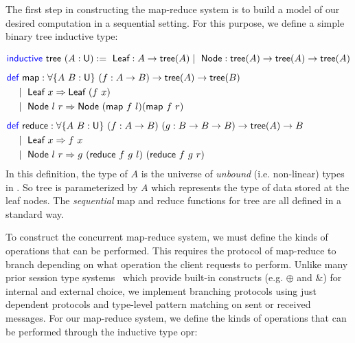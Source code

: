 The first step in constructing the map-reduce system is to build a model of our desired
computation in a sequential setting. For this purpose, we define a simple binary tree
inductive type:

\vspace{-1em}
\begingroup
\small
\addtolength{\jot}{-0.25em}
\begin{alignat*}{4}
  &\Inductive\ \textsf{tree}\ (A : \Un) :=\
    \textsf{Leaf} : A \rightarrow \textsf{tree}(A) \mid\
    \textsf{Node} : \textsf{tree}(A) \rightarrow \textsf{tree}(A) \rightarrow \textsf{tree}(A)
  \\[0.4em]
  &\begin{alignedat}{4}
    &\Def\ \textsf{map} : \forall \{A\ B : \Un\}\ (f : A \rightarrow B) \rightarrow \textsf{tree}(A) \rightarrow \textsf{tree}(B) \\
    &\quad\mid\ \textsf{Leaf}\ x \Rightarrow \textsf{Leaf}\ (f\ x) \\
    &\quad\mid\ \textsf{Node}\ l\ r \Rightarrow \textsf{Node}\ (\textsf{map}\ f\ l) (\textsf{map}\ f\ r)
  \end{alignedat}
  \\[0.4em]
  &\begin{alignedat}{4}
    &\Def\ \textsf{reduce} : \forall \{A\ B : \Un\}\ (f : A \rightarrow B)\ (g : B \rightarrow B \rightarrow B) \rightarrow \textsf{tree}(A) \rightarrow B \\
    &\quad\mid\ \textsf{Leaf}\ x \Rightarrow f\ x \\
    &\quad\mid\ \textsf{Node}\ l\ r \Rightarrow g\ (\textsf{reduce}\ f\ g\ l)\ (\textsf{reduce}\ f\ g\ r)
  \end{alignedat}
\end{alignat*}
\endgroup
In this definition, the type \Un{} of $A$ is the universe of \emph{unbound}
(i.e. non-linear) types in \TLLC{}. So \textsf{tree} is parameterized by $A$
which represents the type of data stored at the leaf nodes. The \emph{sequential}
\textsf{map} and \textsf{reduce} functions for \textsf{tree} are all defined in a standard way.

To construct the concurrent map-reduce system, we must define the kinds of operations
that can be performed. This requires the protocol of map-reduce to branch depending on
what operation the client requests to perform. Unlike many prior
session type systems~\cite{caires10,das20} which provide built-in constructs
(e.g. $\oplus$ and $\&$) for internal and external choice, we implement branching
protocols using just dependent protocols and type-level pattern matching on sent or received
messages. For our map-reduce system, we define the kinds of operations that can be performed
through the inductive type \textsf{opr}:

